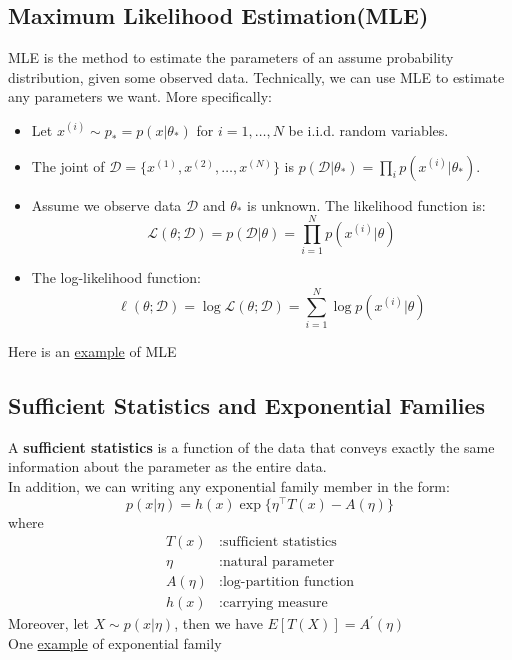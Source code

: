 \subsection*{Maximum Likelihood Estimation(MLE)}
MLE is the method to estimate the parameters of an assume probability distribution, given some observed data. Technically, we can use MLE to estimate any parameters we want. More specifically:
\begin{itemize}
    \item Let $x^{(i)} \sim {p_*} = p(x | \theta_*)$ for $i = 1, \ldots, N$ be i.i.d. random variables.
    \item The joint of $\mathcal{D} = \{ x^{(1)}, x^{(2)}, \ldots, x^{(N)} \}$ is $p(\mathcal{D} | \theta_*) = \prod_{i} p(x^{(i)} | \theta_*)$.
    \item Assume we observe data $\mathcal{D}$ and $\theta_*$ is unknown. The likelihood function is:
    $$
    \mathcal{L}(\theta; \mathcal{D}) = p(\mathcal{D} | \theta) = \prod_{i=1}^{N} p(x^{(i)} | \theta)
    $$
    \item The log-likelihood function:
    $$
    \ell(\theta; \mathcal{D}) = \log \mathcal{L}(\theta; \mathcal{D}) = \sum_{i=1}^{N} \log p(x^{(i)} | \theta)
    $$
\end{itemize}
Here is an \hyperref[example-1]{example} of MLE
\subsection*{Sufficient Statistics and Exponential Families}
A \textbf{sufficient statistics} is a function of the data that conveys exactly the same information about the parameter as the entire data.\\
In addition, we can writing any exponential family member in the form:
$$p(x | \eta) = h(x) \exp \{ \eta^{\top} T(x) - A(\eta) \}$$
where
\begin{align*}
    T(x) &: \text{sufficient statistics} \\
    \eta &: \text{natural parameter} \\
    A(\eta) &: \text{log-partition function} \\
    h(x) &: \text{carrying measure}
\end{align*}
Moreover, let $X\sim p(x|\eta)$, then we have $E[T(X)]=A^\prime(\eta)$\\
One \hyperref[example-2]{example} of exponential family

